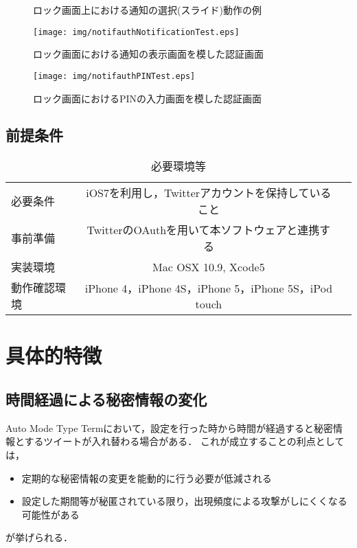 \begin{figure}[ht]
\begin{center}
\end{center}
\caption{ロック画面上における通知の選択(スライド)動作の例}
\label{fig:notificationSliding}
\end{figure}

\begin{figure}[ht]
\begin{minipage}{0.5\hsize}
\begin{center}
\texttt{[image: img/notifauthNotificationTest.eps]}
\end{center}
\caption{ロック画面における通知の表示画面を模した認証画面}
\label{fig:notifauthNotificationTest}
\end{minipage}
\begin{minipage}{0.5\hsize}
\begin{center}
\texttt{[image: img/notifauthPINTest.eps]}
\end{center}
\caption{ロック画面におけるPINの入力画面を模した認証画面}
\label{fig:notifauthPINTest}
\end{minipage}
\end{figure}

\subsection{前提条件}
\begin{table}[htpb]
\begin{center}
\caption{必要環境等}
\label{tbl:requirements}
\vspace{4mm}
\begin{tabular}{l||c|r}
必要条件 & iOS7を利用し，Twitterアカウントを保持していること \\
事前準備 & TwitterのOAuthを用いて本ソフトウェアと連携する \\
実装環境 & Mac OSX 10.9, Xcode5 \\
動作確認環境 & iPhone 4，iPhone 4S，iPhone 5，iPhone 5S，iPod touch \\
\end{tabular}
\end{center}
\end{table}

\section{具体的特徴}\label{sec:feature}
\subsection{時間経過による秘密情報の変化}
Auto Mode Type Termにおいて，設定を行った時から時間が経過すると秘密情報とするツイートが入れ替わる場合がある．
これが成立することの利点としては，
\begin{itemize}
\item 定期的な秘密情報の変更を能動的に行う必要が低減される
\item 設定した期間等が秘匿されている限り，出現頻度による攻撃がしにくくなる可能性がある
\end{itemize}
が挙げられる．

